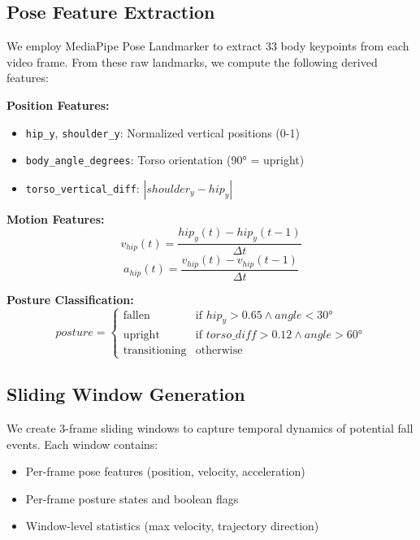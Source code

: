 \documentclass[conference]{IEEEtran}
\begin{document}
\subsection{Pose Feature Extraction}

We employ MediaPipe Pose Landmarker to extract 33 body keypoints from each video frame. From these raw landmarks, we compute the following derived features:

\textbf{Position Features:}
\begin{itemize}
    \item \texttt{hip\_y}, \texttt{shoulder\_y}: Normalized vertical positions (0-1)
    \item \texttt{body\_angle\_degrees}: Torso orientation (90° = upright)
    \item \texttt{torso\_vertical\_diff}: $|shoulder_y - hip_y|$
\end{itemize}

\textbf{Motion Features:}
\begin{equation}
    v_{hip}(t) = \frac{hip_y(t) - hip_y(t-1)}{\Delta t}
\end{equation}
\begin{equation}
    a_{hip}(t) = \frac{v_{hip}(t) - v_{hip}(t-1)}{\Delta t}
\end{equation}

\textbf{Posture Classification:}
\begin{equation}
    posture = \begin{cases}
        \text{fallen} & \text{if } hip_y > 0.65 \land angle < 30° \\
        \text{upright} & \text{if } torso\_diff > 0.12 \land angle > 60° \\
        \text{transitioning} & \text{otherwise}
    \end{cases}
\end{equation}

\subsection{Sliding Window Generation}

We create 3-frame sliding windows to capture temporal dynamics of potential fall events. Each window contains:
\begin{itemize}
    \item Per-frame pose features (position, velocity, acceleration)
    \item Per-frame posture states and boolean flags
    \item Window-level statistics (max velocity, trajectory direction)
\end{itemize}
\end{document}
